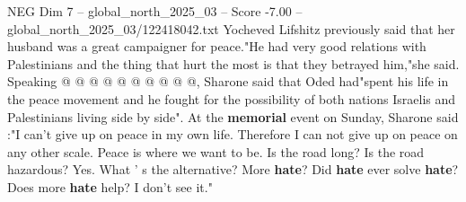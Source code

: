 \begin{textsample}{NEG Dim 7 – global\_north\_2025\_03 – Score -7.00 – global\_north\_2025\_03/122418042.txt}
Yocheved Lifshitz previously said that her husband was a great campaigner for peace."He had very good relations with Palestinians and the thing that hurt the most is that they betrayed him,"she said.
Speaking @ @ @ @ @ @ @ @ @ @, Sharone said that Oded had"spent his life in the peace movement and he fought for the possibility of both nations Israelis and Palestinians living side by side".
At the \textbf{memorial} event on Sunday, Sharone said :"I can't give up on peace in my own life.
Therefore I can not give up on peace on any other scale.
Peace is where we want to be.
Is the road long?
Is the road hazardous?
Yes.
What ' s the alternative?
More \textbf{hate}?
Did \textbf{hate} ever solve \textbf{hate}?
Does more \textbf{hate} help?
I don't see it."

\end{textsample}
